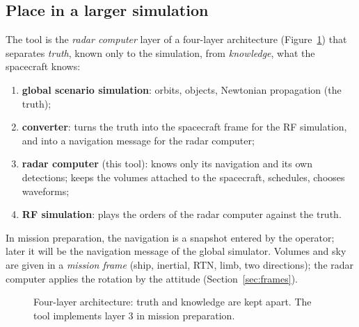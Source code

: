 \documentclass[11pt,a4paper]{article}
\begin{document}
\subsection{Place in a larger simulation}
The tool is the \emph{radar computer} layer of a four-layer architecture (Figure~\ref{fig:layers}) that separates
\emph{truth}, known only to the simulation, from \emph{knowledge}, what the spacecraft knows:
\begin{enumerate}
  \item \textbf{global scenario simulation}: orbits, objects, Newtonian propagation (the truth);
  \item \textbf{converter}: turns the truth into the spacecraft frame for the RF simulation, and into a navigation
        message for the radar computer;
  \item \textbf{radar computer} (this tool): knows only its navigation and its own detections; keeps the volumes
        attached to the spacecraft, schedules, chooses waveforms;
  \item \textbf{RF simulation}: plays the orders of the radar computer against the truth.
\end{enumerate}
In mission preparation, the navigation is a snapshot entered by the operator; later it will be the navigation
message of the global simulator. Volumes and sky are given in a \emph{mission frame} (ship, inertial, RTN, limb, two
directions); the radar computer applies the rotation by the attitude (Section~\ref{sec:frames}).

\begin{figure}[ht]
\centering
{}
\caption{Four-layer architecture: truth and knowledge are kept apart. The tool implements layer 3 in mission
preparation.}
\label{fig:layers}
\end{figure}
\end{document}
